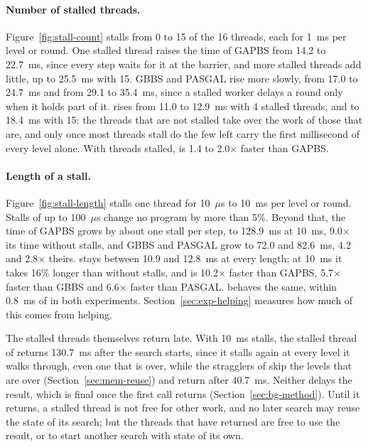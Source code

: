 \paragraph{Number of stalled threads.} Figure~\ref{fig:stall-count} stalls from 0 to 15 of the 16 threads, each for 1~ms per level or round. One stalled thread raises the time of GAPBS from 14.2 to 22.7~ms, since every step waits for it at the barrier, and more stalled threads add little, up to 25.5~ms with 15. GBBS and PASGAL rise more slowly, from 17.0 to 24.7~ms and from 29.1 to 35.4~ms, since a stalled worker delays a round only when it holds part of it. \wfdo rises from 11.0 to 12.9~ms with 4 stalled threads, and to 18.4~ms with 15: the threads that are not stalled take over the work of those that are, and only once most threads stall do the few left carry the first millisecond of every level alone. With threads stalled, \wfdo is 1.4 to 2.0$\times$ faster than GAPBS.

\paragraph{Length of a stall.} Figure~\ref{fig:stall-length} stalls one thread for 10~$\mu$s to 10~ms per level or round. Stalls of up to 100~$\mu$s change no program by more than 5\%. Beyond that, the time of GAPBS grows by about one stall per step, to 128.9~ms at 10~ms, 9.0$\times$ its time without stalls, and GBBS and PASGAL grow to 72.0 and 82.6~ms, 4.2 and 2.8$\times$ theirs. \wfdo stays between 10.9 and 12.8~ms at every length; at 10~ms it takes 16\% longer than without stalls, and is 10.2$\times$ faster than GAPBS, 5.7$\times$ faster than GBBS and 6.6$\times$ faster than PASGAL. \wfdomem behaves the same, within 0.8~ms of \wfdo in both experiments. Section~\ref{sec:exp-helping} measures how much of this comes from helping.

The stalled threads themselves return late. With 10~ms stalls, the stalled thread of \wfdo returns 130.7~ms after the search starts, since it stalls again at every level it walks through, even one that is over, while the stragglers of \wfdomem skip the levels that are over (Section~\ref{sec:mem-reuse}) and return after 40.7~ms. Neither delays the result, which is final once the first call returns (Section~\ref{sec:bg-method}). Until it returns, a stalled thread is not free for other work, and no later search may reuse the state of its search; but the threads that have returned are free to use the result, or to start another search with state of its own.

